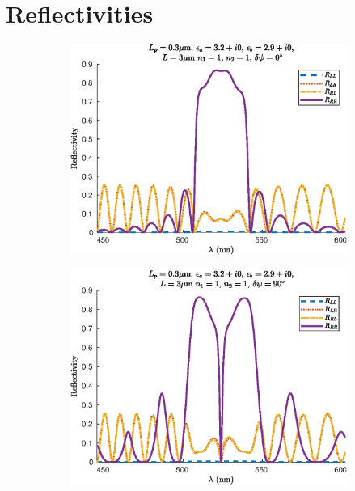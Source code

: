 \chapter{Reflectivities}
\label{chap:reflectivities}

\begin{figure}
	\centering
	\begin{subfigure}{0.49\linewidth}
		\includegraphics[width=\linewidth]{plots/defect/no_defect/cwt_reflection}
		\caption{}
	\end{subfigure}
	\begin{subfigure}{0.49\linewidth}
		\includegraphics[width=\linewidth]{plots/defect/reflectivity/cwt_reflection}
		\caption{}

\end{subfigure}
\end{figure}
